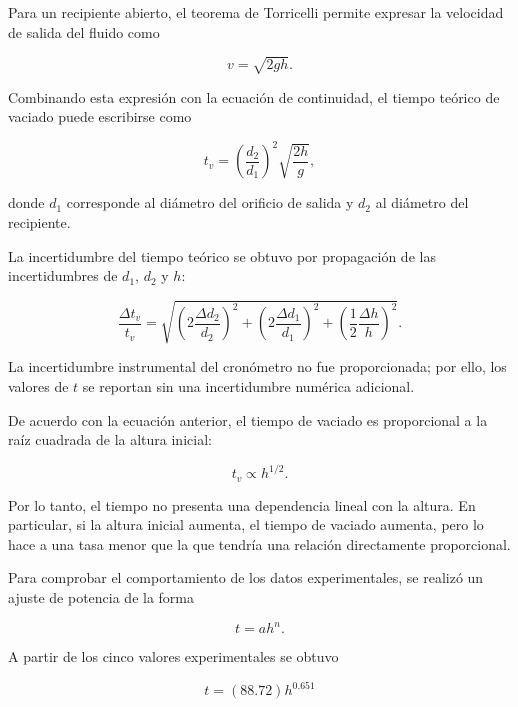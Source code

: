 Para un recipiente abierto, el teorema de Torricelli permite expresar la velocidad de salida del fluido como \cite{young2018}

\begin{equation}
v=\sqrt{2gh}.
\end{equation}

Combinando esta expresión con la ecuación de continuidad, el tiempo teórico de vaciado puede escribirse como

\begin{equation}
t_v=
\left(\frac{d_2}{d_1}\right)^2
\sqrt{\frac{2h}{g}},
\end{equation}

donde $d_1$ corresponde al diámetro del orificio de salida y $d_2$ al diámetro del recipiente. 

La incertidumbre del tiempo teórico se obtuvo por propagación de las incertidumbres de $d_1$, $d_2$ y $h$:

\begin{equation}
\frac{\Delta t_v}{t_v}=
\sqrt{
\left(2\frac{\Delta d_2}{d_2}\right)^2+
\left(2\frac{\Delta d_1}{d_1}\right)^2+
\left(\frac{1}{2}\frac{\Delta h}{h}\right)^2
}.
\end{equation}

La incertidumbre instrumental del cronómetro no fue proporcionada; por ello, los valores de $t$ se reportan sin una incertidumbre numérica adicional.

De acuerdo con la ecuación anterior, el tiempo de vaciado es proporcional a la raíz cuadrada de la altura inicial:

\begin{equation}
t_v\propto h^{1/2}.
\end{equation}

Por lo tanto, el tiempo no presenta una dependencia lineal con la altura. En particular, si la altura inicial aumenta, el tiempo de vaciado aumenta, 
pero lo hace a una tasa menor que la que tendría una relación directamente proporcional.

Para comprobar el comportamiento de los datos experimentales, se realizó un ajuste de potencia de la forma

\begin{equation}
t=ah^n.
\end{equation}

A partir de los cinco valores experimentales se obtuvo

\begin{equation}
\boxed{
t=(88.72)h^{0.651}
}
\end{equation}

